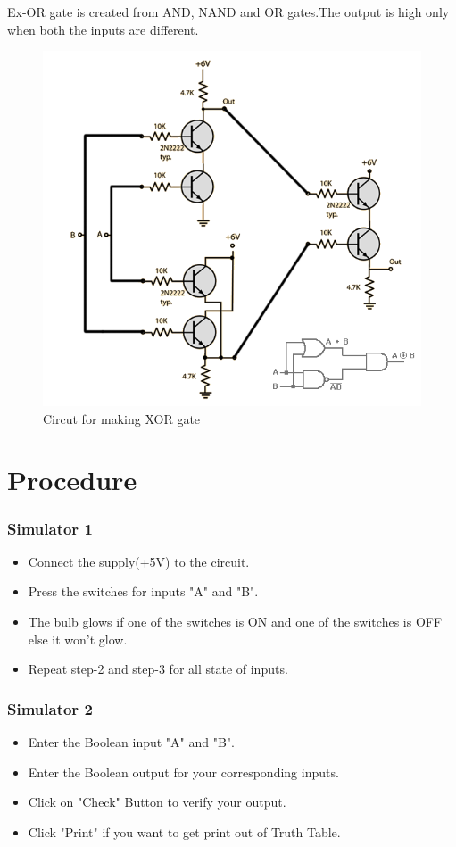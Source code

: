	Ex-OR gate is created from AND, NAND and OR gates.The output is high only when both the inputs are different.
	
	\begin{figure}[h]
		\centering
		\includegraphics{img/exp6/3}
		\caption{Circut for making XOR gate}
		\label{fig:6:3}
	\end{figure}
				
\section{Procedure}
	\subsubsection{Simulator 1}
	\begin{itemize}
		\tightlist
		\item Connect the supply(+5V) to the circuit.
		\item Press the switches for inputs "A" and "B".
		\item The bulb glows if one of the switches is ON and one of the switches is OFF else it won't glow.
		\item Repeat step-2 and step-3 for all state of inputs.
	\end{itemize}

	\subsubsection{Simulator 2}
	\begin{itemize}
		\tightlist
		\item Enter the Boolean input "A" and "B".
		\item Enter the Boolean output for your corresponding inputs.
		\item Click on "Check" Button to verify your output.
		\item Click "Print" if you want to get print out of Truth Table.
	\end{itemize}


